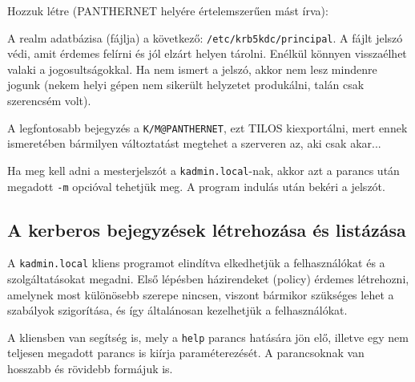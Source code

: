 
\newpage
Hozzuk létre (PANTHERNET helyére értelemszerűen mást írva):


A realm adatbázisa (fájlja) a következő: \texttt{/etc/krb5kdc/principal}. A fájlt jelszó védi, amit érdemes felírni és
jól elzárt helyen tárolni. Enélkül könnyen visszaélhet valaki a jogosultságokkal. Ha nem ismert a jelszó, akkor nem
lesz mindenre jogunk (nekem helyi gépen nem sikerült helyzetet produkálni, talán csak szerencsém volt).

A legfontosabb bejegyzés a \texttt{K/M@PANTHERNET}, ezt TILOS kiexportálni, mert ennek ismeretében bármilyen
változtatást megtehet a szerveren az, aki csak akar...

Ha meg kell adni a mesterjelszót a \texttt{kadmin.local}-nak, akkor azt a parancs után megadott \texttt{-m} opcióval
tehetjük meg. A program indulás után bekéri a jelszót.

\subsection{A kerberos bejegyzések létrehozása és listázása}
A \texttt{kadmin.local} kliens programot elindítva elkedhetjük a felhasználókat és a szolgáltatásokat megadni. Első lépésben
házirendeket (policy) érdemes létrehozni, amelynek most különösebb szerepe nincsen, viszont bármikor szükséges lehet a
szabályok szigorítása, és így általánosan kezelhetjük a felhasználókat.

A kliensben van segítség is, mely a \texttt{help} parancs hatására jön elő, illetve egy nem teljesen megadott parancs
is kiírja paraméterezését. A parancsoknak van hosszabb és rövidebb formájuk is.

